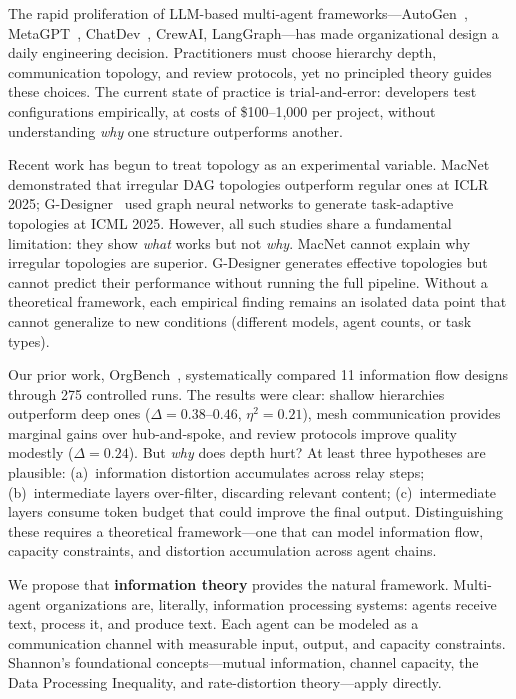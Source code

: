 \documentclass[conference]{IEEEtran}
\begin{document}
The rapid proliferation of LLM-based multi-agent frameworks---AutoGen~\cite{wu2023autogen}, MetaGPT~\cite{hong2023metagpt}, ChatDev~\cite{qian2024chatdev}, CrewAI, LangGraph---has made organizational design a daily engineering decision.
Practitioners must choose hierarchy depth, communication topology, and review protocols, yet no principled theory guides these choices.
The current state of practice is trial-and-error: developers test configurations empirically, at costs of \$100--1,000 per project, without understanding \emph{why} one structure outperforms another.

Recent work has begun to treat topology as an experimental variable.
MacNet~\cite{qian2025macnet} demonstrated that irregular DAG topologies outperform regular ones at ICLR 2025;
G-Designer~\cite{yao2025gdesigner} used graph neural networks to generate task-adaptive topologies at ICML 2025.
However, all such studies share a fundamental limitation:
they show \emph{what} works but not \emph{why}.
MacNet cannot explain why irregular topologies are superior.
G-Designer generates effective topologies but cannot predict their performance without running the full pipeline.
Without a theoretical framework, each empirical finding remains an isolated data point that cannot generalize to new conditions (different models, agent counts, or task types).

Our prior work, OrgBench~\cite{shinoda2026orgbench}, systematically compared 11 information flow designs through 275 controlled runs.
The results were clear: shallow hierarchies outperform deep ones ($\Delta = 0.38$--$0.46$, $\eta^2 = 0.21$), mesh communication provides marginal gains over hub-and-spoke, and review protocols improve quality modestly ($\Delta = 0.24$).
But \emph{why} does depth hurt?
At least three hypotheses are plausible:
(a)~information distortion accumulates across relay steps;
(b)~intermediate layers over-filter, discarding relevant content;
(c)~intermediate layers consume token budget that could improve the final output.
Distinguishing these requires a theoretical framework---one that can model information flow, capacity constraints, and distortion accumulation across agent chains.

We propose that \textbf{information theory} provides the natural framework.
Multi-agent organizations are, literally, information processing systems: agents receive text, process it, and produce text.
Each agent can be modeled as a communication channel with measurable input, output, and capacity constraints.
Shannon's foundational concepts---mutual information, channel capacity, the Data Processing Inequality, and rate-distortion theory---apply directly.
\end{document}
